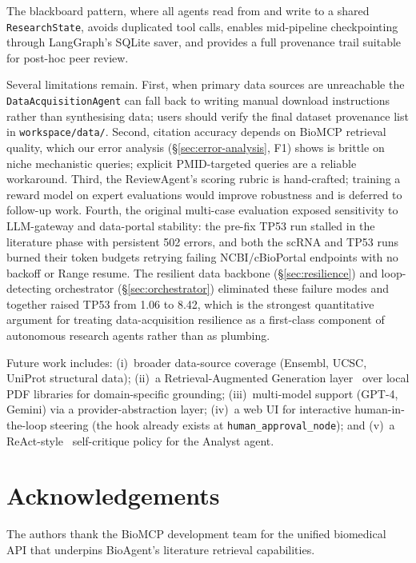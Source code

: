 \documentclass[11pt]{article}
\begin{document}
The blackboard pattern, where all agents read from and write to a
shared \texttt{ResearchState}, avoids duplicated tool calls, enables
mid-pipeline checkpointing through LangGraph's SQLite saver, and
provides a full provenance trail suitable for post-hoc peer review.

Several limitations remain.
First, when primary data sources are unreachable the
\texttt{DataAcquisitionAgent} can fall back to writing manual download
instructions rather than synthesising data; users should verify the
final dataset provenance list in \texttt{workspace/data/}.
Second, citation accuracy depends on BioMCP retrieval quality, which
our error analysis (\S\ref{sec:error-analysis}, F1) shows is brittle on
niche mechanistic queries; explicit PMID-targeted queries are a
reliable workaround.
Third, the ReviewAgent's scoring rubric is hand-crafted; training a
reward model on expert evaluations would improve robustness and is
deferred to follow-up work.
Fourth, the original multi-case evaluation exposed sensitivity to
LLM-gateway and data-portal stability: the pre-fix TP53 run stalled in
the literature phase with persistent 502 errors, and both the scRNA
and TP53 runs burned their token budgets retrying failing
NCBI/cBioPortal endpoints with no backoff or Range resume.
The resilient data backbone (\S\ref{sec:resilience}) and loop-detecting
orchestrator (\S\ref{sec:orchestrator}) eliminated these failure modes
and together raised TP53 from 1.06 to 8.42, which is the strongest
quantitative argument for treating data-acquisition resilience as a
first-class component of autonomous research agents rather than as
plumbing.

Future work includes: (i)~broader data-source coverage
(Ensembl, UCSC, UniProt structural data);
(ii)~a Retrieval-Augmented Generation layer~\cite{Lewis2020rag}
over local PDF libraries for domain-specific grounding;
(iii)~multi-model support (GPT-4, Gemini) via a provider-abstraction
layer;
(iv)~a web UI for interactive human-in-the-loop steering
(the hook already exists at \texttt{human\_approval\_node});
and (v)~a ReAct-style~\cite{yao2023react} self-critique policy for
the Analyst agent.

\section*{Acknowledgements}
The authors thank the BioMCP development team for the unified biomedical
API that underpins BioAgent's literature retrieval capabilities.
\end{document}

